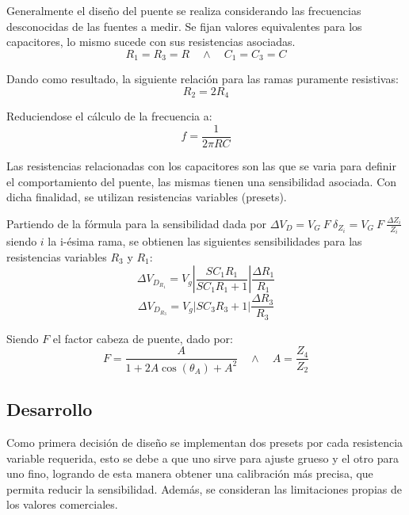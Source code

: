 Generalmente el diseño del puente se realiza considerando las frecuencias desconocidas de las fuentes a medir. Se fijan valores equivalentes para los capacitores, lo mismo sucede con sus resistencias asociadas. 
\begin{equation}
R_1=R_3=R \quad	\wedge \quad C_1=C_3=C
\end{equation}

Dando como resultado, la siguiente relación para las ramas puramente resistivas:
\begin{equation}
R_2=2R_4
\end{equation}

Reduciendose el cálculo de la frecuencia a:
\begin{equation}
f=\frac{1}{2\pi RC}
\label{frec}
\end{equation}

Las resistencias relacionadas con los capacitores son las que se varia para definir el comportamiento del puente, las mismas tienen una sensibilidad asociada. Con dicha finalidad, se utilizan resistencias variables (presets). 

Partiendo de la fórmula para la sensibilidad dada por $\Delta V_D=V_G \ F \ \delta_{Z_i}=V_G \ F \ \frac{\Delta Z_i}{Z_i}$ siendo $i$ la i-ésima rama, se obtienen las siguientes sensibilidades para las resistencias variables $R_3$ y $R_1$:
\begin{equation}
\Delta V_{D_{R_1}}=V_g\left|\frac{SC_1R_1}{SC_1R_1+1}\right|\frac{\Delta R_1}{R_1}
\end{equation}
\begin{equation}
\Delta V_{D_{R_3}}=V_g\left|SC_3R_3+1\right|\frac{\Delta R_3}{R_3}
\end{equation}

Siendo $F$ el factor cabeza de puente, dado por:
\begin{equation}
F=\frac{A}{1+2A\cos(\theta_A)+A^2} \quad \wedge \quad A=\frac{Z_4}{Z_2}
\label{cabeza_de_puente}
\end{equation} 

\subsection{Desarrollo}

Como primera decisión de diseño se implementan dos presets por cada resistencia variable requerida, esto se debe a que uno sirve para ajuste grueso y el otro para uno fino, logrando de esta manera obtener una calibración más precisa, que permita reducir la sensibilidad. Además, se consideran las limitaciones propias de los valores comerciales.

